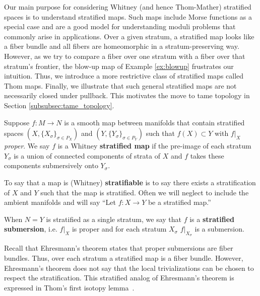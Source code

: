 Our main purpose for considering Whitney (and hence Thom-Mather) stratified spaces is to understand stratified maps. Such maps include Morse functions as a special case and are a good model for understanding moduli problems that commonly arise in applications. Over a given stratum, a stratified map looks like a fiber bundle and all fibers are homeomorphic in a stratum-preserving way. However, as we try to compare a fiber over one stratum with a fiber over that stratum's frontier, the blow-up map of Example \ref{ex:blowup} frustrates our intuition. Thus, we introduce a more restrictive class of stratified maps called Thom maps. Finally, we illustrate that such general stratified maps are not necessarily closed under pullback. This motivates the move to tame topology in Section \ref{subsubsec:tame_topology}.

\begin{defn}
	Suppose $f:M\to N$ is a smooth map between manifolds that contain stratified spaces $(X,\{X_{\sigma}\}_{\sigma\in P_X})$ and $(Y,\{Y_{\sigma}\}_{\sigma\in P_Y})$ such that $f(X)\subset Y$ with $f|_X$ \emph{proper}. We say $f$ is a Whitney \textbf{stratified map} if the pre-image of each stratum $Y_{\sigma}$ is a union of connected components of strata of $X$ and $f$ takes these components submersively onto $Y_{\sigma}$.
\end{defn}
\begin{rmk}
	To say that a map is (Whitney) \textbf{stratifiable} is to say there exists a stratification of $X$ and $Y$ such that the map is stratified. Often we will neglect to include the ambient manifolds and will say ``Let $f:X\to Y$ be a stratified map.'' 
\end{rmk}
\begin{rmk}
	When $N=Y$ is stratified as a single stratum, we say that $f$ is a \textbf{stratified submersion}, i.e. $f|_X$ is proper and for each stratum $X_{\sigma}$ $f|_{X_{\sigma}}$ is a submersion.
\end{rmk}

Recall that Ehresmann's theorem states that proper submersions are fiber bundles. Thus, over each stratum a stratified map is a fiber bundle. However, Ehresmann's theorem does not say that the local trivializations can be chosen to respect the stratification. This stratified analog of Ehresmann's theorem is expressed in Thom's first isotopy lemma~\cite[p.~41]{GM}.

